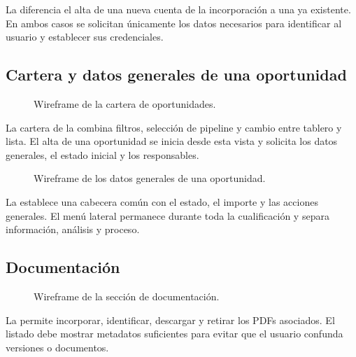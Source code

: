 La  diferencia el alta de una nueva cuenta de la
incorporación a una ya existente. En ambos casos se solicitan únicamente los
datos necesarios para identificar al usuario y establecer sus credenciales.

\subsection{Cartera y datos generales de una oportunidad}

\begin{figure}[H]
  \centering
  \resizebox{\textwidth}{!}{
    
  }
  \caption{Wireframe de la cartera de oportunidades.}
  \label{fig:wireframe-opportunity-portfolio}
\end{figure}

La cartera de la  combina filtros,
selección de pipeline y cambio entre tablero y lista. El alta de una oportunidad
se inicia desde esta vista y solicita los datos generales, el estado inicial y
los responsables.

\begin{figure}[H]
  \centering
  \resizebox{\textwidth}{!}{
    
  }
  \caption{Wireframe de los datos generales de una oportunidad.}
  \label{fig:wireframe-opportunity-details}
\end{figure}

La  establece una cabecera común con el
estado, el importe y las acciones generales. El menú lateral permanece durante
toda la cualificación y separa información, análisis y proceso.

\subsection{Documentación}

\begin{figure}[H]
  \centering
  \resizebox{\textwidth}{!}{
    
  }
  \caption{Wireframe de la sección de documentación.}
  \label{fig:wireframe-qualification-documents}
\end{figure}

La  permite incorporar, identificar,
descargar y retirar los PDFs asociados. El listado debe mostrar metadatos
suficientes para evitar que el usuario confunda versiones o documentos.

